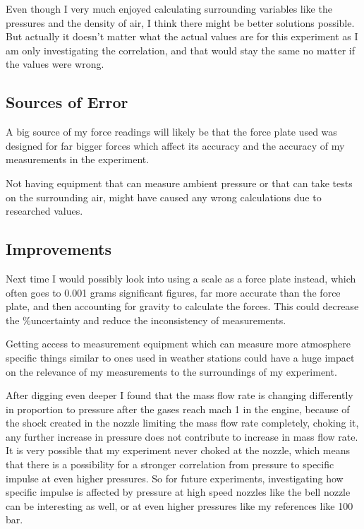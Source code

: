 \documentclass[12pt,a4paper]{article}
\begin{document}
Even though I very much enjoyed calculating surrounding variables like the pressures and the density of air, I think there might be better solutions possible. But actually it doesn't matter what the actual values are for this experiment as I am only investigating the correlation, and that would stay the same no matter if the values were wrong.

\subsection{Sources of Error}

A big source of my force readings will likely be that the force plate used was designed for far bigger forces which affect its accuracy and the accuracy of my measurements in the experiment.

Not having equipment that can measure ambient pressure or that can take tests on the surrounding air, might have caused any wrong calculations due to researched values.

\subsection{Improvements}

Next time I would possibly look into using a scale as a force plate instead, which often goes to 0.001 grams significant figures, far more accurate than the force plate, and then accounting for gravity to calculate the forces. This could decrease the \%uncertainty and reduce the inconsistency of measurements.

Getting access to measurement equipment which can measure more atmosphere specific things similar to ones used in weather stations could have a huge impact on the relevance of my measurements to the surroundings of my experiment.

After digging even deeper I found that the mass flow rate is changing differently in proportion to pressure after the gases reach mach 1 in the engine, because of the shock created in the nozzle limiting the mass flow rate completely, choking it, any further increase in pressure does not contribute to increase in mass flow rate. It is very possible that my experiment never choked at the nozzle, which means that there is a possibility for a stronger correlation from pressure to specific impulse at even higher pressures. So for future experiments, investigating how specific impulse is affected by pressure at high speed nozzles like the bell nozzle can be interesting as well, or at even higher pressures like my references like 100 bar.
\end{document}
